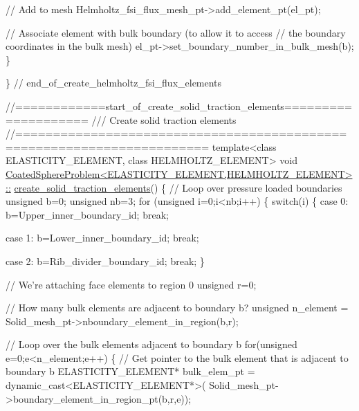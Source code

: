 \begin{DoxyCodeInclude}
{   \textcolor{comment}{// Add to mesh}
   Helmholtz\_fsi\_flux\_mesh\_pt->add\_element\_pt(el\_pt);
   
   \textcolor{comment}{// Associate element with bulk boundary (to allow it to access}
   \textcolor{comment}{// the boundary coordinates in the bulk mesh)}
   el\_pt->set\_boundary\_number\_in\_bulk\_mesh(b); 
  \}  
  
\} \textcolor{comment}{// end\_of\_create\_helmholtz\_fsi\_flux\_elements}


\textcolor{comment}{//============start\_of\_create\_solid\_traction\_elements====================}\textcolor{comment}{}
\textcolor{comment}{/// Create solid traction elements }
\textcolor{comment}{}\textcolor{comment}{//=======================================================================}
\textcolor{keyword}{template}<\textcolor{keyword}{class} ELASTICITY\_ELEMENT, \textcolor{keyword}{class} HELMHOLTZ\_ELEMENT>
\textcolor{keywordtype}{void} \hyperlink{classCoatedSphereProblem_a93cb1d435858c7a1835cbd74f7cb5db8}{CoatedSphereProblem<ELASTICITY\_ELEMENT,HELMHOLTZ\_ELEMENT>::}
\hyperlink{classCoatedSphereProblem_a93cb1d435858c7a1835cbd74f7cb5db8}{create\_solid\_traction\_elements}()
\{
 \textcolor{comment}{// Loop over pressure loaded boundaries}
 \textcolor{keywordtype}{unsigned} b=0;
 \textcolor{keywordtype}{unsigned} nb=3;
 \textcolor{keywordflow}{for} (\textcolor{keywordtype}{unsigned} i=0;i<nb;i++) 
  \{
   \textcolor{keywordflow}{switch}(i)
    \{
    \textcolor{keywordflow}{case} 0:
     b=Upper\_inner\_boundary\_id;
     \textcolor{keywordflow}{break};
     
    \textcolor{keywordflow}{case} 1:
     b=Lower\_inner\_boundary\_id;
     \textcolor{keywordflow}{break};
     
    \textcolor{keywordflow}{case} 2:
     b=Rib\_divider\_boundary\_id;
     \textcolor{keywordflow}{break};
    \}
   
   \textcolor{comment}{// We're attaching face elements to region 0}
   \textcolor{keywordtype}{unsigned} r=0;
   
   \textcolor{comment}{// How many bulk elements are adjacent to boundary b?}
   \textcolor{keywordtype}{unsigned} n\_element = Solid\_mesh\_pt->nboundary\_element\_in\_region(b,r);
   
   \textcolor{comment}{// Loop over the bulk elements adjacent to boundary b}
   \textcolor{keywordflow}{for}(\textcolor{keywordtype}{unsigned} e=0;e<n\_element;e++)
    \{
     \textcolor{comment}{// Get pointer to the bulk element that is adjacent to boundary b}
     ELASTICITY\_ELEMENT* bulk\_elem\_pt = \textcolor{keyword}{dynamic\_cast<}ELASTICITY\_ELEMENT*\textcolor{keyword}{>}(
      Solid\_mesh\_pt->boundary\_element\_in\_region\_pt(b,r,e));
     
}
\end{DoxyCodeInclude}
